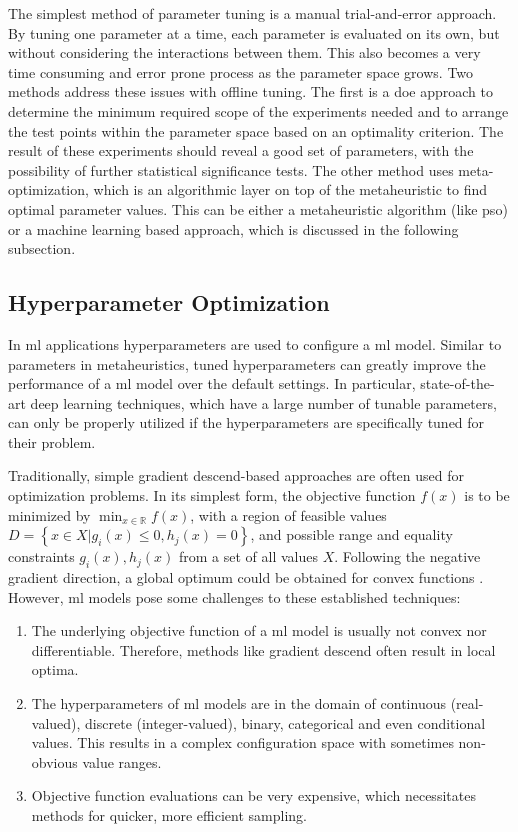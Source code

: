 The simplest method of parameter tuning is a manual trial-and-error approach. By tuning one parameter at a time, each parameter is evaluated on its own, but without considering the interactions between them. This also becomes a very time consuming and error prone process as the parameter space grows.
Two methods address these issues with offline tuning. The first is a \gls{doe} approach to determine the minimum required scope of the experiments needed and to arrange the test points within the parameter space based on an optimality criterion. The result of these experiments should reveal a good set of parameters, with the possibility of further statistical significance tests.  
The other method uses meta-optimization, which is an algorithmic layer on top of the metaheuristic to find optimal parameter values. This can be either a metaheuristic algorithm (like \gls{pso}) or a machine learning based approach, which is discussed in the following subsection.


\subsection{Hyperparameter Optimization}
\label{chap:hyperopt}

In \gls{ml} applications hyperparameters are used to configure a \gls{ml} model. Similar to parameters in metaheuristics, tuned hyperparameters can greatly improve the performance of a \gls{ml} model over the default settings. In particular, state-of-the-art deep learning techniques, which have a large number of tunable parameters, can only be properly utilized if the hyperparameters are specifically tuned for their problem.

Traditionally, simple gradient descend-based approaches are often used for optimization problems. In its simplest form, the objective function $f(x)$ is to be minimized by $\min_{x \in \mathbb{R}} f(x)$, with a region of feasible values $D = \left\lbrace { x \in X | g_i(x) \leq 0, h_j(x) = 0}\right\rbrace $, and possible range and equality constraints $g_i(x), h_j(x)$ from a set of all values $X$. Following the negative gradient direction, a global optimum could be obtained for convex functions \cite{yang2020hyperparameter}. 
However, \gls{ml} models pose some challenges to these established techniques:
\begin{enumerate}
	\item The underlying objective function of a \gls{ml} model is usually not convex nor differentiable. Therefore, methods like gradient descend often result in local optima.
	\item The hyperparameters of \gls{ml} models are in the domain of continuous (real-valued),  discrete (integer-valued), binary, categorical and even conditional values. This results in a complex configuration space with sometimes non-obvious value ranges.
	\item Objective function evaluations can be very expensive, which necessitates methods for quicker, more efficient sampling. 
\end{enumerate}

